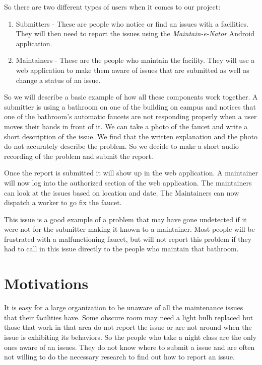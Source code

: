 \documentclass{acm_proc_article-sp}
\begin{document}
So there are two different types of users when it comes to our project:
\vspace{-4mm}
\begin{enumerate}[itemsep=2mm]
\item Submitters - These are people who notice or find an issues with a facilities. They will then need to report the issues using the \textit{Maintain-e-Nator} Android application.
\item Maintainers - These are the people who maintain the facility. They will use a web application to make them aware of issues that are submitted as well as change a status of an issue.
\end{enumerate}

So we will describe a basic example of how all these components work together. A submitter is using a bathroom on one of the building on campus and notices that one of the bathroom's automatic faucets are not responding properly when a user moves their hands in front of it. We can take a photo of the faucet and write a short description of the issue. We find that the written explanation and the photo do not accurately describe the problem. So we decide to make a short audio recording of the problem and submit the report.

Once the report is submitted it will show up in the web application. A maintainer will now log into the authorized section of the web application. The maintainers can look at the issues based on location and date. The Maintainers can now dispatch a worker to go fix the faucet. 

This issue is a good example of a problem that may have gone undetected if it were not for the submitter making it known to a maintainer. Most people will be frustrated with a malfunctioning faucet, but will not report this problem if they had to call in this issue directly to the people who maintain that bathroom. 

\section{Motivations}
It is easy for a large organization to be unaware of all the maintenance issues that their facilities have. Some obscure room may need a light bulb replaced but those that work in that area do not report the issue or are not around when the issue is exhibiting its behaviors.  So the people who take a night class are the only ones aware of an issues.  They do not know where to submit a issue and are often not willing to do the necessary research to find out how to report an issue.
\end{document}
